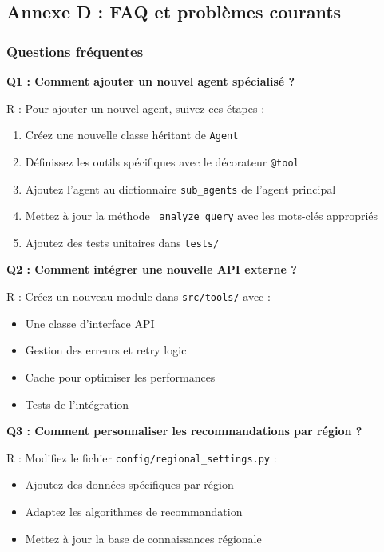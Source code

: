 \subsection{Annexe D : FAQ et problèmes courants}

\subsubsection{Questions fréquentes}

\textbf{Q1 : Comment ajouter un nouvel agent spécialisé ?}

R : Pour ajouter un nouvel agent, suivez ces étapes :
\begin{enumerate}
    \item Créez une nouvelle classe héritant de \texttt{Agent}
    \item Définissez les outils spécifiques avec le décorateur \texttt{@tool}
    \item Ajoutez l'agent au dictionnaire \texttt{sub\_agents} de l'agent principal
    \item Mettez à jour la méthode \texttt{\_analyze\_query} avec les mots-clés appropriés
    \item Ajoutez des tests unitaires dans \texttt{tests/}
\end{enumerate}

\textbf{Q2 : Comment intégrer une nouvelle API externe ?}

R : Créez un nouveau module dans \texttt{src/tools/} avec :
\begin{itemize}
    \item Une classe d'interface API
    \item Gestion des erreurs et retry logic
    \item Cache pour optimiser les performances
    \item Tests de l'intégration
\end{itemize}

\textbf{Q3 : Comment personnaliser les recommandations par région ?}

R : Modifiez le fichier \texttt{config/regional\_settings.py} :
\begin{itemize}
    \item Ajoutez des données spécifiques par région
    \item Adaptez les algorithmes de recommandation
    \item Mettez à jour la base de connaissances régionale
\end{itemize}

